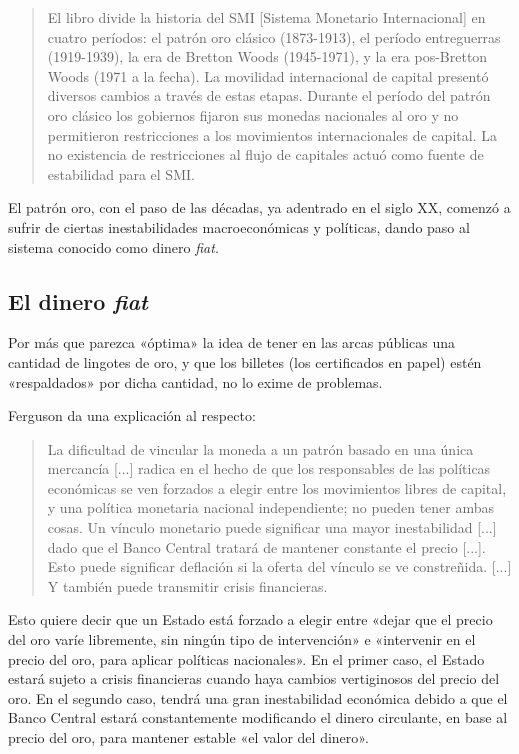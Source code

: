 \documentclass[12pt,a4paper,twoside]{book}
\begin{document}
\begin{quotation}
El libro divide la historia del SMI [Sistema Monetario Internacional] en cuatro períodos: el patrón oro clásico (1873-1913), el período entreguerras (1919-1939), la era de Bretton Woods (1945-1971), y la era pos-Bretton Woods (1971 a la fecha). La movilidad internacional de capital presentó diversos cambios a través de estas etapas. Durante el período del patrón oro clásico los gobiernos fijaron sus monedas nacionales al oro y no permitieron restricciones a los movimientos internacionales de capital. La no existencia de restricciones al flujo de capitales actuó como fuente de estabilidad para el SMI. \cite[pág. 275]{susan-capital}
\end{quotation}

El patrón oro, con el paso de las décadas, ya adentrado en el siglo XX, comenzó a sufrir de ciertas inestabilidades macroeconómicas y políticas, dando paso al sistema conocido como dinero \textit{fiat}.

\subsection{El dinero \textit{fiat}}
Por más que parezca «óptima» la idea de tener en las arcas públicas una cantidad de lingotes de oro, y que los billetes (los certificados en papel) estén «respaldados» por dicha cantidad, no lo exime de problemas.

Ferguson da una explicación al respecto:

\begin{quotation}
La dificultad de vincular la moneda a un patrón basado en una única mercancía [...] radica en el hecho de que los responsables de las políticas económicas se ven forzados a elegir entre los movimientos libres de capital, y una política monetaria nacional independiente; no pueden tener ambas cosas. Un vínculo monetario puede significar una mayor inestabilidad [...] dado que el Banco Central tratará de mantener constante el precio [...]. Esto puede significar deflación si la oferta del vínculo se ve constreñida. [...] Y también puede transmitir crisis financieras. \cite[págs. 75-76]{triunfo-dinero}
\end{quotation}

Esto quiere decir que un Estado está forzado a elegir entre «dejar que el precio del oro varíe libremente, sin ningún tipo de intervención» e «intervenir en el precio del oro, para aplicar políticas nacionales». En el primer caso, el Estado estará sujeto a crisis financieras cuando haya cambios vertiginosos del precio del oro. En el segundo caso, tendrá una gran inestabilidad económica debido a que el Banco Central estará constantemente modificando el dinero circulante, en base al precio del oro, para mantener estable «el valor del dinero».
\end{document}
